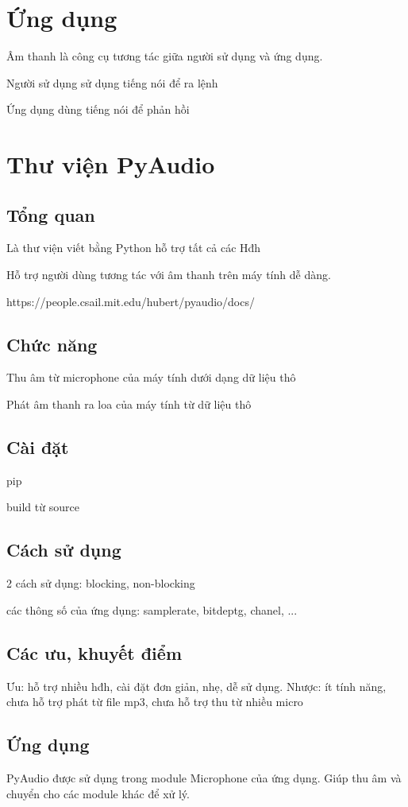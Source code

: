 \section{Ứng dụng}
Âm thanh là công cụ tương tác giữa người sử dụng và ứng dụng.

Người sử dụng sử dụng tiếng nói để ra lệnh

Ứng dụng dùng tiếng nói để phản hồi

\section{Thư viện PyAudio}
\subsection{Tổng quan}
Là thư viện viết bằng Python hỗ trợ tất cả các Hđh

Hỗ trợ người dùng tương tác với âm thanh trên máy tính dễ dàng.

https://people.csail.mit.edu/hubert/pyaudio/docs/
\subsection{Chức năng}
Thu âm từ microphone của máy tính dưới dạng dữ liệu thô

Phát âm thanh ra loa của máy tính từ dữ liệu thô
\subsection{Cài đặt}
pip

build từ source
\subsection{Cách sử dụng}
2 cách sử dụng: blocking, non-blocking

các thông số của ứng dụng: samplerate, bitdeptg, chanel, ...
\subsection{Các ưu, khuyết điểm}
Ưu: hỗ trợ nhiều hđh, cài đặt đơn giản, nhẹ, dễ sử dụng.
Nhược: ít tính năng, chưa hỗ trợ phát từ file mp3, chưa hỗ trợ thu từ nhiều micro
\subsection{Ứng dụng}
PyAudio được sử dụng trong module Microphone của ứng dụng. Giúp thu âm và chuyển cho các module khác để xử lý.





